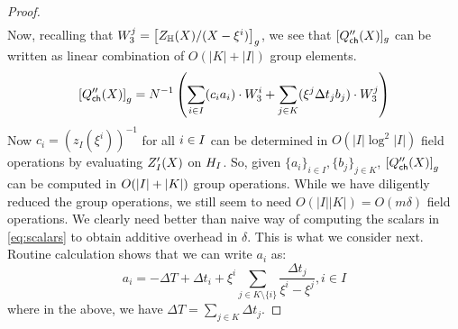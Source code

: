 \begin{proof}
\begin{gather}
    \end{gather}
    Now, recalling that
    $W_3^j=\left[{Z_\mathbb{H}(X)/(X-\xi^i)}\right]_g$, we see that $[Q''_{\mathsf{ch}}({X})]_g$ can be written as linear combination of $O(|K|+|I|)$ group elements.
    \begin{equation}\label{eq:Qcachepoly2commit}
    \left[{Q''_{\mathsf{ch}}({X})}\right]_g = N^{-1}\left(\sum_{i\in I}(c_ia_i)\cdot W_3^i + \sum_{j\in K}(\xi^j \Delta t_j b_j)\cdot W_3^j\right)
    \end{equation}
    Now $c_i=(z_I(\xi^i))^{-1}$ for all $i \in I$ can be determined in $O(|I|\log^2 |I|)$ field operations by evaluating $Z_{I}'(X)$ on
    $H_{I}$. So, given $\{a_i\}_{i\in I}, \{b_j\}_{j\in K}$, $\left[{Q''_{\mathsf{ch}}({X})}\right]_g$ can be computed in $O(|I|+|K|)$ group operations.
    While we have diligently reduced the group operations, we still seem to need $O(|I||K|)=O(m\delta)$ field operations. We clearly need better than
    naive way of computing the scalars in \eqref{eq:scalars} to obtain additive overhead in $\delta$. This is what we consider next.
    Routine calculation shows that we can write $a_i$ as:
    \begin{equation*}
        a_i = -\Delta T + \Delta t_i + \xi^i\sum_{j\in K\setminus\{i\}}\frac{\Delta t_j}{\xi^i-\xi^j}, i\in I
    \end{equation*}
    where in the above, we have $\Delta T=\sum_{j\in K}\Delta t_j$.


\end{proof}
